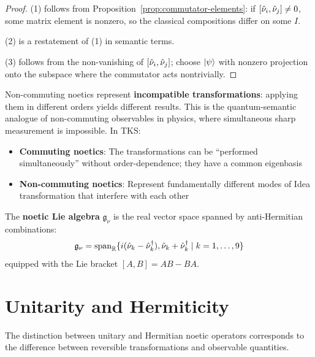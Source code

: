 \begin{proof}
(1) follows from Proposition~\ref{prop:commutator-elements}: if $[\hat{\nu}_i, \hat{\nu}_j] \neq 0$, some matrix element is nonzero, so the classical compositions differ on some $I$.

(2) is a restatement of (1) in semantic terms.

(3) follows from the non-vanishing of $[\hat{\nu}_i, \hat{\nu}_j]$; choose $|\psi\rangle$ with nonzero projection onto the subspace where the commutator acts nontrivially.
\end{proof}

\begin{remark}
\label{rem:noncomm-interp}
Non-commuting noetics represent \textbf{incompatible transformations}: applying them in different orders yields different results. This is the quantum-semantic analogue of non-commuting observables in physics, where simultaneous sharp measurement is impossible. In TKS:
\begin{itemize}
  \item \textbf{Commuting noetics}: The transformations can be ``performed simultaneously'' without order-dependence; they have a common eigenbasis
  \item \textbf{Non-commuting noetics}: Represent fundamentally different modes of Idea transformation that interfere with each other
\end{itemize}
\end{remark}

\begin{definition}
\label{def:noetic-lie}
The \textbf{noetic Lie algebra} $\mathfrak{g}_\nu$ is the real vector space spanned by anti-Hermitian combinations:
\[
\mathfrak{g}_\nu = \mathrm{span}_{\mathbb{R}}\{i(\hat{\nu}_k - \hat{\nu}_k^\dagger), \hat{\nu}_k + \hat{\nu}_k^\dagger \mid k = 1,\ldots,9\}
\]
equipped with the Lie bracket $[A, B] = AB - BA$.
\end{definition}

\section{Unitarity and Hermiticity}
\label{sec:unitarity-hermiticity}

The distinction between unitary and Hermitian noetic operators corresponds to the difference between reversible transformations and observable quantities.

